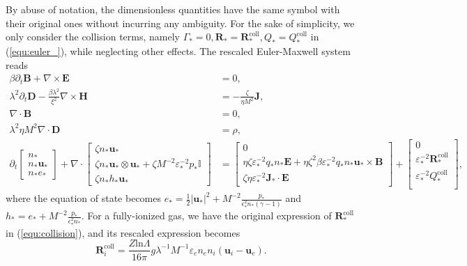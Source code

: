 \documentclass{article}
\begin{document}
By abuse of notation, the dimensionless quantities have the same symbol with their original ones without incurring any ambiguity. For the sake of simplicity, we only consider the collision terms, namely $\Gamma_* = 0, \mathbf{R}_* = \mathbf{R}_*^\text{coll}, Q_* = Q_*^\text{coll}$ in (\ref{equ:euler_}), while neglecting other effects. The rescaled Euler-Maxwell system reads
\begin{subequations}
\begin{align}
    \beta \partial_t \mathbf{B} + \nabla \times \mathbf{E} &= 0, \label{equ:maxwell_faraday_rescalling} \\ 
    \lambda^2 \partial_t \mathbf{D} - \frac{\beta \lambda^2}{\xi^2}\nabla \times \mathbf{H} &= - \frac{\zeta}{\eta M^2}\mathbf{J}, \label{equ:maxwell_ampere_rescalling} \\
    \nabla \cdot \mathbf{B} &= 0,  \label{equ:maxwell_gauss_B_rescalling}\\
    \lambda^2 \eta M^2 \nabla \cdot \mathbf{D} &= \rho, \label{equ:maxwell_gauss_D_rescalling} \\
    \partial_t
    \begin{bmatrix}
    n_* \\
    n_* \mathbf{u}_* \\
    n_* e_*
    \end{bmatrix}
    + \nabla \cdot
    \begin{bmatrix}
    \zeta n_* \mathbf{u}_* \\
    \zeta n_* \mathbf{u}_* \otimes \mathbf{u}_* + \zeta M^{-2} \varepsilon_*^{-2} p_*\mathbb{I} \\
    \zeta n_* h_* \mathbf{u}_*
    \end{bmatrix}
    &=
    \begin{bmatrix}
    0 \\
    \eta \zeta \varepsilon_*^{-2} q_* n_*\mathbf{E} + \eta \zeta^2 \beta \varepsilon_*^{-2} q_* n_* \mathbf{u}_* \times \mathbf{B} \\
    \zeta \eta \varepsilon_*^{-2} \mathbf{J}_* \cdot \mathbf{E}
    \end{bmatrix} +
    \begin{bmatrix}
    0 \\
    \varepsilon_*^{-2}\mathbf{R}_*^{\text{coll}} \\
    \varepsilon_*^{-2}Q_*^{\text{coll}} \\
    \end{bmatrix}, \label{equ:euler_rescalling}
\end{align}
\end{subequations}
where the equation of state becomes $e_* = \frac{1}{2}|\mathbf{u_*}|^2 + M^{-2}\frac{p_*}{\epsilon^2_* n_* (\gamma - 1)}$ and $h_* = e_* + M^{-2}\frac{p_*}{\epsilon^2_* n_*}$. For a fully-ionized gas, we have the original expression of $\mathbf{R}_*^{\text{coll}}$ in (\ref{equ:collision}), and its rescaled expression becomes
\begin{equation*}
    \mathbf{R}_i^{\text{coll}} = \frac{Z\text{ln}\Lambda}{16\pi}g\lambda^{-1}M^{-1}\varepsilon_en_en_i(\mathbf{u}_i - \mathbf{u}_e). 
\end{equation*}
\end{document}
